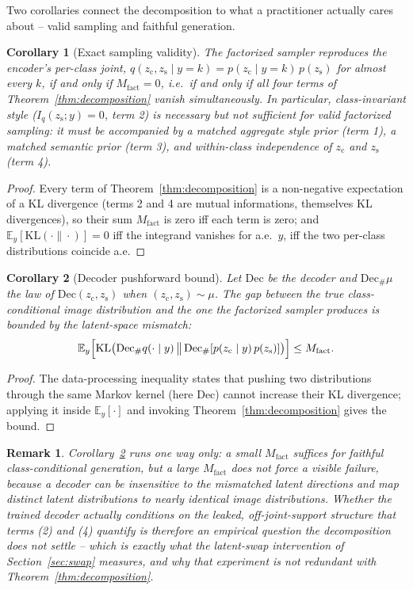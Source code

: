 \documentclass[10pt,letterpaper]{article}
\newcommand{\zc}{z_{\mathrm{c}}}
\newcommand{\zs}{z_{\mathrm{s}}}
\newcommand{\KL}{\mathrm{KL}}
\newtheorem{corollary}{Corollary}
\newtheorem{remark}{Remark}
\begin{document}
Two corollaries connect the decomposition to what a practitioner actually
cares about -- valid sampling and faithful generation.

\begin{corollary}[Exact sampling validity]
\label{cor:validity}
The factorized sampler reproduces the encoder's per-class joint,
$q(\zc,\zs\mid y{=}k)=p(\zc\mid y{=}k)\,p(\zs)$ for almost every $k$, if and
only if $M_{\mathrm{fact}}=0$, i.e.\ if and only if all four terms of
Theorem~\ref{thm:decomposition} vanish simultaneously. In particular,
class-invariant style ($I_q(\zs;y)=0$, term 2) is \emph{necessary but not
sufficient} for valid factorized sampling: it must be accompanied by a
matched aggregate style prior (term 1), a matched semantic prior (term 3),
and within-class independence of $\zc$ and $\zs$ (term 4).
\end{corollary}

\begin{proof}
Every term of Theorem~\ref{thm:decomposition} is a non-negative expectation
of a KL divergence (terms 2 and 4 are mutual informations, themselves KL
divergences), so their sum $M_{\mathrm{fact}}$ is zero iff each term is
zero; and $\mathbb E_y[\KL(\cdot\|\cdot)]=0$ iff the integrand vanishes for
a.e.\ $y$, iff the two per-class distributions coincide a.e.
\end{proof}

\begin{corollary}[Decoder pushforward bound]
\label{cor:pushforward}
Let $\mathrm{Dec}$ be the decoder and $\mathrm{Dec}_\#\mu$ the law of
$\mathrm{Dec}(\zc,\zs)$ when $(\zc,\zs)\sim\mu$. The gap between the true
class-conditional image distribution and the one the factorized sampler
produces is bounded by the latent-space mismatch:
\[
\mathbb E_y\Bigl[\KL\bigl(\mathrm{Dec}_\# q(\cdot\mid y)\,\big\|\,
\mathrm{Dec}_\#[p(\zc\mid y)\,p(\zs)]\bigr)\Bigr] \le M_{\mathrm{fact}}.
\]
\end{corollary}

\begin{proof}
The data-processing inequality states that pushing two distributions through
the same Markov kernel (here $\mathrm{Dec}$) cannot increase their KL
divergence; applying it inside $\mathbb E_y[\cdot]$ and invoking
Theorem~\ref{thm:decomposition} gives the bound.
\end{proof}

\begin{remark}
Corollary~\ref{cor:pushforward} runs one way only: a small
$M_{\mathrm{fact}}$ \emph{suffices} for faithful class-conditional
generation, but a large $M_{\mathrm{fact}}$ does not \emph{force} a visible
failure, because a decoder can be insensitive to the mismatched latent
directions and map distinct latent distributions to nearly identical image
distributions. Whether the trained decoder actually conditions on the
leaked, off-joint-support structure that terms (2) and (4) quantify is
therefore an empirical question the decomposition does not settle -- which is
exactly what the latent-swap intervention of Section~\ref{sec:swap}
measures, and why that experiment is not redundant with
Theorem~\ref{thm:decomposition}.
\end{remark}
\end{document}
